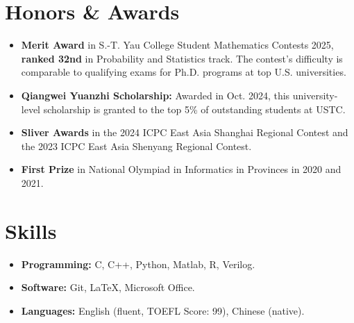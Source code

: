 \documentclass[a4paper,12pt]{ctexart}
\begin{document}
\section{\textbf{Honors \& Awards}}
\begin{itemize}
    \item \textbf{Merit Award} in S.-T. Yau College Student Mathematics Contests 2025, \textbf{ranked 32nd} in Probability and Statistics track. The contest's difficulty is comparable to qualifying exams for Ph.D. programs at top U.S. universities. \vspace{-0.25cm}
    \item \textbf{Qiangwei Yuanzhi Scholarship:} Awarded in Oct. 2024, this university-level scholarship is granted to the top 5\% of outstanding students at USTC. \vspace{-0.25cm}
    \item \textbf{Sliver Awards} in the 2024 ICPC East Asia Shanghai Regional Contest and the 2023 ICPC East Asia Shenyang Regional Contest. \vspace{-0.25cm}
    \item \textbf{First Prize} in National Olympiad in Informatics in Provinces in 2020 and 2021.
\end{itemize}




\section{\textbf{Skills}}
\begin{itemize}
    \item \textbf{Programming:} C, C++, Python, Matlab, R, Verilog. \vspace{-0.25cm}
    \item \textbf{Software:} Git, \LaTeX, Microsoft Office. \vspace{-0.25cm}
    \item \textbf{Languages:}  English (fluent, TOEFL Score: 99), Chinese (native).
\end{itemize}



\end{document}
